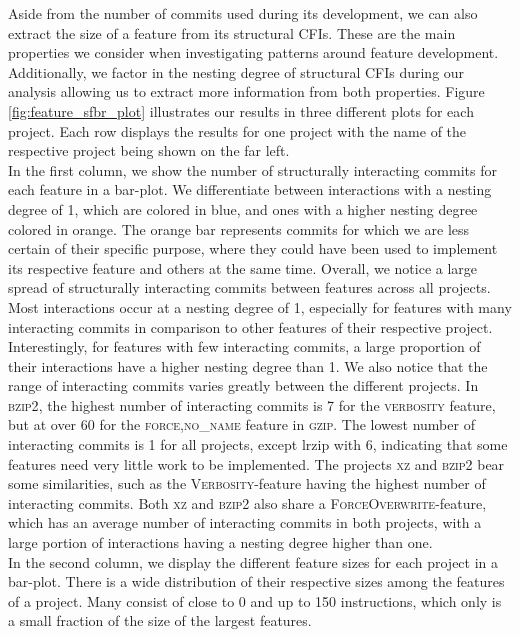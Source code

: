 Aside from the number of commits used during its development, we can also extract the size of a feature from its structural CFIs.
These are the main properties we consider when investigating patterns around feature development.
Additionally, we factor in the nesting degree of structural CFIs during our analysis allowing us to extract more information from both properties.
Figure \ref{fig:feature_sfbr_plot} illustrates our results in three different plots for each project.
Each row displays the results for one project with the name of the respective project being shown on the far left. \\
In the first column, we show the number of structurally interacting commits for each feature in a bar-plot.
We differentiate between interactions with a nesting degree of 1, which are colored in blue, and ones with a higher nesting degree colored in orange.
The orange bar represents commits for which we are less certain of their specific purpose, where they could have been used to implement its respective feature and others at the same time. 
Overall, we notice a large spread of structurally interacting commits between features across all projects.
Most interactions occur at a nesting degree of 1, especially for features with many interacting commits in comparison to other features of their respective project.
Interestingly, for features with few interacting commits, a large proportion of their interactions have a higher nesting degree than 1.
We also notice that the range of interacting commits varies greatly between the different projects.
In \textsc{bzip2}, the highest number of interacting commits is 7 for the \textsc{verbosity} feature, but at over 60 for the \textsc{force,no\_name} feature in \textsc{gzip}.
The lowest number of interacting commits is 1 for all projects, except lrzip with 6, indicating that some features need very little work to be implemented.
The projects \textsc{xz} and \textsc{bzip2} bear some similarities, such as the \textsc{Verbosity}-feature having the highest number of interacting commits.
Both \textsc{xz} and \textsc{bzip2} also share a \textsc{ForceOverwrite}-feature, which has an average number of interacting commits in both projects, with a large portion of interactions having a nesting degree higher than one. \\
In the second column, we display the different feature sizes for each project in a bar-plot.
There is a wide distribution of their respective sizes among the features of a project.
Many consist of close to 0 and up to 150 instructions, which only is a small fraction of the size of the largest features.

